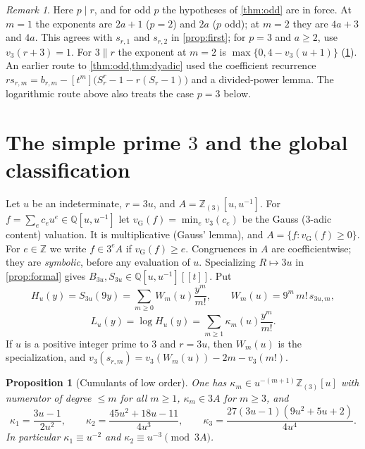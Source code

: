 \documentclass[11pt,reqno]{amsart}
\newtheorem{proposition}[theorem]{Proposition}
\theoremstyle{definition}
\theoremstyle{remark}
\newtheorem{remark}[theorem]{Remark}
\theoremstyle{plain}
\newcommand{\Z}{\mathbb Z}
\newcommand{\Q}{\mathbb Q}
\newcommand{\Zloc}{\mathbb Z_{(3)}}
\newcommand{\vG}{v_{\mathrm G}}
\begin{document}
\begin{remark}
Here $p\mid r$, and for odd $p$ the hypotheses of \cref{thm:odd} are in force. At $m=1$ the exponents are $2a+1$ ($p=2$) and $2a$ ($p$ odd); at $m=2$ they are $4a+3$ and $4a$. This agrees with $s_{r,1}$ and $s_{r,2}$ in \cref{prop:first}; for $p=3$ and $a\ge2$, use $v_3(r+3)=1$. For $3\parallel r$ the exponent at $m=2$ is $\max\{0,4-v_3(u+1)\}$ (\cref{sec:simple3}). An earlier route to \cref{thm:odd,thm:dyadic} used the coefficient recurrence $rs_{r,m}=b_{r,m}-[t^m]\bigl(S_r^r-1-r(S_r-1)\bigr)$ and a divided-power lemma. The logarithmic route above also treats the case $p=3$ below.
\end{remark}

\section{The simple prime \texorpdfstring{$3$}{3} and the global classification}\label{sec:simple3}

Let $u$ be an indeterminate, $r=3u$, and $A=\Zloc[u,u^{-1}]$. For $f=\sum_ec_eu^e\in\Q[u,u^{-1}]$ let $\vG(f)=\min_ev_3(c_e)$ be the Gauss ($3$-adic content) valuation. It is multiplicative (Gauss' lemma), and $A=\{f:\vG(f)\ge0\}$. For $e\in\Z$ we write $f\in3^eA$ if $\vG(f)\ge e$. Congruences in $A$ are coefficientwise; they are \emph{symbolic}, before any evaluation of $u$. Specializing $R\mapsto3u$ in \cref{prop:formal} gives $B_{3u},S_{3u}\in\Q[u,u^{-1}][[t]]$. Put
\[
H_u(y)=S_{3u}(9y)=\sum_{m\ge0}W_m(u)\frac{y^m}{m!},\qquad W_m(u)=9^m\,m!\,s_{3u,m},
\]
\[
L_u(y)=\log H_u(y)=\sum_{m\ge1}\kappa_m(u)\frac{y^m}{m!}.
\]
If $u$ is a positive integer prime to $3$ and $r=3u$, then $W_m(u)$ is the specialization, and $v_3(s_{r,m})=v_3(W_m(u))-2m-v_3(m!)$.

\begin{proposition}[Cumulants of low order]\label{prop:kappa}
One has $\kappa_m\in u^{-(m+1)}\Zloc[u]$ with numerator of degree $\le m$ for all $m\ge1$, $\kappa_m\in3A$ for $m\ge3$, and
\[
\kappa_1=\frac{3u-1}{2u^2},\qquad \kappa_2=\frac{45u^2+18u-11}{4u^3},\qquad \kappa_3=\frac{27(3u-1)(9u^2+5u+2)}{4u^4}.
\]
In particular $\kappa_1\equiv u^{-2}$ and $\kappa_2\equiv u^{-3}\pmod{3A}$.
\end{proposition}
\end{document}
